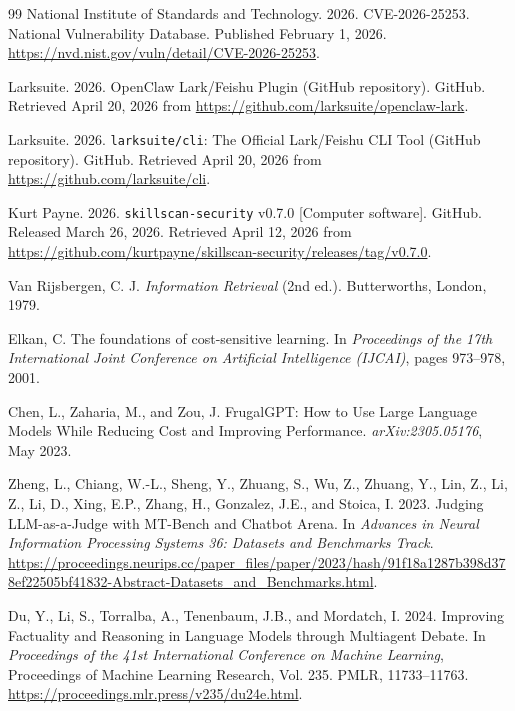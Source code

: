 \documentclass[sigconf,nonacm]{acmart}
\begin{document}
\begin{thebibliography}{99}
National Institute of Standards and Technology. 2026. CVE-2026-25253. National Vulnerability Database. Published February 1, 2026. \url{https://nvd.nist.gov/vuln/detail/CVE-2026-25253}.

Larksuite. 2026. OpenClaw Lark/Feishu Plugin (GitHub repository). GitHub. Retrieved April 20, 2026 from \url{https://github.com/larksuite/openclaw-lark}.

Larksuite. 2026. \texttt{larksuite/cli}: The Official Lark/Feishu CLI Tool (GitHub repository). GitHub. Retrieved April 20, 2026 from \url{https://github.com/larksuite/cli}.

Kurt Payne. 2026. \texttt{skillscan-security} v0.7.0 [Computer software]. GitHub. Released March 26, 2026. Retrieved April 12, 2026 from \url{https://github.com/kurtpayne/skillscan-security/releases/tag/v0.7.0}.

Van Rijsbergen, C. J. \textit{Information Retrieval} (2nd ed.). Butterworths, London, 1979.

Elkan, C. The foundations of cost-sensitive learning. In \textit{Proceedings of the 17th International Joint Conference on Artificial Intelligence (IJCAI)}, pages 973--978, 2001.

Chen, L., Zaharia, M., and Zou, J. FrugalGPT: How to Use Large Language Models While Reducing Cost and Improving Performance. \textit{arXiv:2305.05176}, May 2023.

Zheng, L., Chiang, W.-L., Sheng, Y., Zhuang, S., Wu, Z., Zhuang, Y., Lin, Z., Li, Z., Li, D., Xing, E.P., Zhang, H., Gonzalez, J.E., and Stoica, I. 2023. Judging LLM-as-a-Judge with MT-Bench and Chatbot Arena. In \textit{Advances in Neural Information Processing Systems 36: Datasets and Benchmarks Track}. \url{https://proceedings.neurips.cc/paper_files/paper/2023/hash/91f18a1287b398d378ef22505bf41832-Abstract-Datasets_and_Benchmarks.html}.

Du, Y., Li, S., Torralba, A., Tenenbaum, J.B., and Mordatch, I. 2024. Improving Factuality and Reasoning in Language Models through Multiagent Debate. In \textit{Proceedings of the 41st International Conference on Machine Learning}, Proceedings of Machine Learning Research, Vol. 235. PMLR, 11733--11763. \url{https://proceedings.mlr.press/v235/du24e.html}.

\end{thebibliography}
\end{document}
